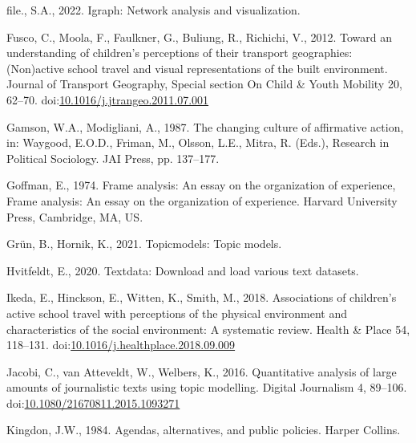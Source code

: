 \documentclass[]{elsarticle} %
\newlength{\cslhangindent}
\newlength{\cslentryspacingunit} %
\newenvironment{CSLReferences}[2] %
 {%
  \setlength{\parindent}{0pt}
  \ifodd #1
  \let\oldpar\par
  \def\par{\hangindent=\cslhangindent\oldpar}
  \fi
  \setlength{\parskip}{#2\cslentryspacingunit}
 }%
 {}
\begin{document}
\begin{CSLReferences}{1}{0}
\leavevmode{}%
file., S.A., 2022. Igraph: Network analysis and visualization.

\leavevmode{}%
Fusco, C., Moola, F., Faulkner, G., Buliung, R., Richichi, V., 2012.
Toward an understanding of children's perceptions of their transport
geographies: (Non)active school travel and visual representations of the
built environment. Journal of Transport Geography, Special {section On
Child} \& {Youth Mobility} 20, 62--70.
doi:\href{https://doi.org/10.1016/j.jtrangeo.2011.07.001}{10.1016/j.jtrangeo.2011.07.001}

\leavevmode{}%
Gamson, W.A., Modigliani, A., 1987. The changing culture of affirmative
action, in: Waygood, E.O.D., Friman, M., Olsson, L.E., Mitra, R. (Eds.),
Research in Political Sociology. {JAI Press}, pp. 137--177.

\leavevmode{}%
Goffman, E., 1974. Frame analysis: An essay on the organization of
experience, Frame analysis: {An} essay on the organization of
experience. {Harvard University Press}, {Cambridge, MA, US}.

\leavevmode{}%
Grün, B., Hornik, K., 2021. Topicmodels: Topic models.

\leavevmode{}%
Hvitfeldt, E., 2020. Textdata: Download and load various text datasets.

\leavevmode{}%
Ikeda, E., Hinckson, E., Witten, K., Smith, M., 2018. Associations of
children's active school travel with perceptions of the physical
environment and characteristics of the social environment: A systematic
review. Health \& Place 54, 118--131.
doi:\href{https://doi.org/10.1016/j.healthplace.2018.09.009}{10.1016/j.healthplace.2018.09.009}

\leavevmode{}%
Jacobi, C., van Atteveldt, W., Welbers, K., 2016. Quantitative analysis
of large amounts of journalistic texts using topic modelling. Digital
Journalism 4, 89--106.
doi:\href{https://doi.org/10.1080/21670811.2015.1093271}{10.1080/21670811.2015.1093271}

\leavevmode{}%
Kingdon, J.W., 1984. Agendas, alternatives, and public policies. {Harper
Collins}.


\end{CSLReferences}
\end{document}
